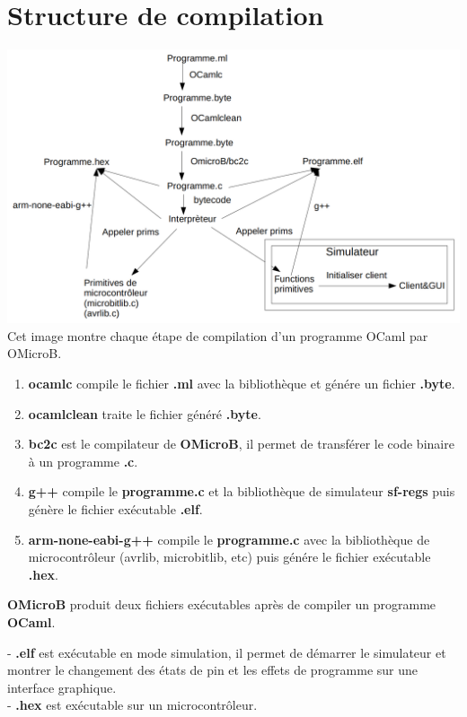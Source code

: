 \documentclass[14px]{article}
\begin{document}
\section{Structure de compilation}
\includegraphics[width=\textwidth]{StructureProgramme.png}\\[1cm]
Cet image montre chaque étape de compilation d'un programme OCaml par OMicroB.
\begin{enumerate}
	\item \textbf{ocamlc} compile le fichier \textbf{.ml} avec la bibliothèque et génére un fichier \textbf{.byte}.
	\item \textbf{ocamlclean} traite le fichier généré \textbf{.byte}.
	\item \textbf{bc2c} est le compilateur de \textbf{OMicroB}, il permet de transférer le code binaire à un programme \textbf{.c}.
	\item \textbf{g++} compile le \textbf{programme.c} et la bibliothèque de simulateur \textbf{sf-regs} puis génère le fichier exécutable \textbf{.elf}.
	\item \textbf{arm-none-eabi-g++} compile le \textbf{programme.c} avec la bibliothèque de microcontrôleur (avrlib, microbitlib, etc) puis génére le fichier exécutable \textbf{.hex}.\\
\end{enumerate}

\textbf{OMicroB} produit deux fichiers exécutables après de compiler un programme \textbf{OCaml}.

- \textbf{.elf} est exécutable en mode simulation, il permet de démarrer le simulateur et montrer le changement des états de pin et les effets de programme sur une interface graphique.\\
- \textbf{.hex} est exécutable sur un microcontrôleur.
\end{document}
